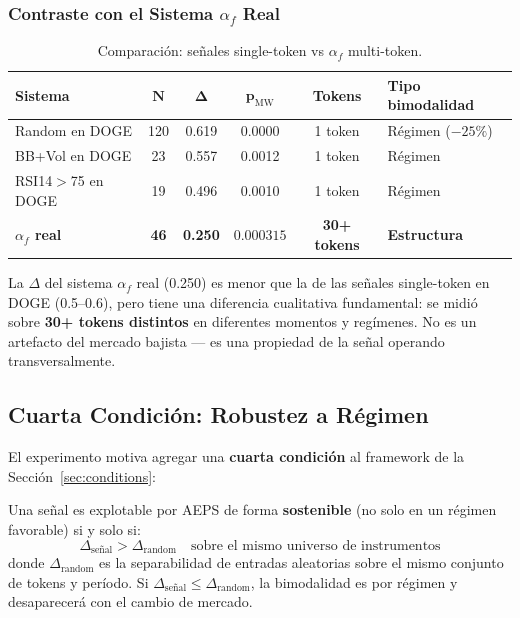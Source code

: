 \documentclass[11pt,a4paper]{article}
\newcommand{\af}{\alpha_f}
\begin{document}
\subsubsection{Contraste con el Sistema $\af$ Real}

\begin{table}[H]
\centering
\caption{Comparaci\'on: se\~nales single-token vs $\af$ multi-token.}
\label{tab:contrast}
\begin{tabular}{lccccl}
\toprule
\textbf{Sistema} & $\bm{N}$ & $\bm{\Delta}$ & $\bm{p}_{\text{MW}}$ &
  \textbf{Tokens} & \textbf{Tipo bimodalidad} \\
\midrule
Random en DOGE & 120 & 0.619 & 0.0000 & 1 token & R\'egimen ($-25\%$) \\
BB+Vol en DOGE & 23 & 0.557 & 0.0012 & 1 token & R\'egimen \\
RSI14$>$75 en DOGE & 19 & 0.496 & 0.0010 & 1 token & R\'egimen \\
\midrule
\textbf{$\af$ real} & \textbf{46} & \textbf{0.250} & $\bm{0.000315}$
  & \textbf{30+ tokens} & \textbf{Estructura} \\
\bottomrule
\end{tabular}
\end{table}

La $\Delta$ del sistema $\af$ real (0.250) es menor que la de las
se\~nales single-token en DOGE (0.5--0.6), pero tiene una diferencia
cualitativa fundamental: se midi\'o sobre \textbf{30+ tokens distintos}
en diferentes momentos y reg\'imenes. No es un artefacto del mercado
bajista --- es una propiedad de la se\~nal operando transversalmente.

\subsection{Cuarta Condici\'on: Robustez a R\'egimen}

El experimento motiva agregar una \textbf{cuarta condici\'on} al
framework de la Secci\'on~\ref{sec:conditions}:

\begin{tcolorbox}[keybox, title=Condici\'on 4: Robustez a R\'egimen]
Una se\~nal es explotable por AEPS de forma \textbf{sostenible}
(no solo en un r\'egimen favorable) si y solo si:
\begin{equation}
\boxed{\Delta_{\text{se\~nal}} > \Delta_{\text{random}}
  \quad \text{sobre el mismo universo de instrumentos}}
\end{equation}
donde $\Delta_{\text{random}}$ es la separabilidad de entradas
aleatorias sobre el mismo conjunto de tokens y per\'iodo.
Si $\Delta_{\text{se\~nal}} \leq \Delta_{\text{random}}$, la
bimodalidad es por r\'egimen y desaparecer\'a con el cambio de mercado.
\end{tcolorbox}
\end{document}
